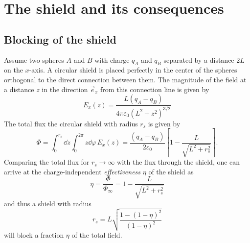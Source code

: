 \chapter{The shield and its consequences}

\section{Blocking of the shield}\label{apx:blocking-of-the-shield}
Assume two spheres $A$ and $B$ with charge $q_A$ and $q_B$ separated by a distance $2L$ on the $x$-axis. A circular shield is placed perfectly in the center of the spheres orthogonal to the direct connection between them. The magnitude of the field at a distance $z$ in the direction $\vec{e}_x$ from this connection line is given by 
\begin{equation}
  E_x(z) = \frac{L(q_A - q_B)}{4\pi\varepsilon_0 (L^2 + z^2)^{3/2}}
\end{equation}
The total flux the circular shield with radius $r_s$ is given by
\begin{equation}
  \Phi = \int_{0}^{r_s}\dd z \int_{0}^{2\pi} z \dd \varphi \, E_x(z) = \frac{(q_A - q_B)}{2 \varepsilon_0} \left[ 1 - \frac{L}{\sqrt{L^2 + r_s^2}} \right] .
\end{equation}
Comparing the total flux for $r_s \rightarrow \infty$ with the flux through the shield, one can arrive at the charge-independent \emph{effectiveness} $\eta$ of the shield as
\begin{equation}
  \eta = \frac{\Phi}{\Phi_\infty} = 1 - \frac{L}{\sqrt{L^2 + r_s^2}}
\end{equation}
and thus a shield with radius
\begin{equation}
  r_s = L \sqrt{\frac{1 - (1-\eta)^2}{(1-\eta)^2}}
\end{equation}
will block a fraction $\eta$ of the total field.

